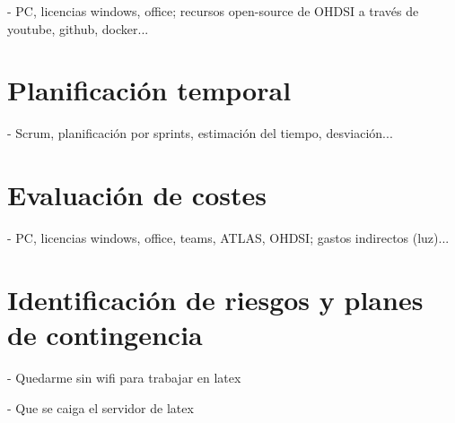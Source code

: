- PC, licencias windows, office; recursos open-source de OHDSI a través de youtube, github, docker...

\section{Planificación temporal} \label{sec:03Temporal}

- Scrum, planificación por sprints, estimación del tiempo, desviación...

\section{Evaluación de costes} \label{sec:03Costes}

- PC, licencias windows, office, teams, ATLAS, OHDSI; gastos indirectos (luz)...

\section{Identificación de riesgos y planes de contingencia} \label{sec:03Riesgos}

- Quedarme sin wifi para trabajar en latex

- Que se caiga el servidor de latex
